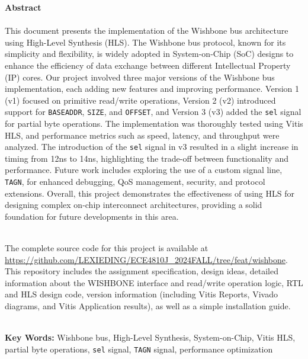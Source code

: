 \documentclass[12pt]{report}
\begin{document}
\newpage
\noindent
{\Large{\textbf{Abstract}}}
\\ \hspace*{\fill} \\
This document presents the implementation of the Wishbone bus architecture using High-Level Synthesis (HLS). The Wishbone bus protocol, known for its simplicity and flexibility, is widely adopted in System-on-Chip (SoC) designs to enhance the efficiency of data exchange between different Intellectual Property (IP) cores. Our project involved three major versions of the Wishbone bus implementation, each adding new features and improving performance. Version 1 (v1) focused on primitive read/write operations, Version 2 (v2) introduced support for \texttt{BASEADDR}, \texttt{SIZE}, and \texttt{OFFSET}, and Version 3 (v3) added the \texttt{sel} signal for partial byte operations. The implementation was thoroughly tested using Vitis HLS, and performance metrics such as speed, latency, and throughput were analyzed. The introduction of the \texttt{sel} signal in v3 resulted in a slight increase in timing from 12ns to 14ns, highlighting the trade-off between functionality and performance. Future work includes exploring the use of a custom signal line, \texttt{TAGN}, for enhanced debugging, QoS management, security, and protocol extensions. Overall, this project demonstrates the effectiveness of using HLS for designing complex on-chip interconnect architectures, providing a solid foundation for future developments in this area.

\noindent
\\
The complete source code for this project is available at \url{https://github.com/LEXIEDING/ECE4810J_2024FALL/tree/feat/wishbone}. This repository includes the assignment specification, design ideas, detailed information about the WISHBONE interface and read/write operation logic, RTL and HLS design code, version information (including Vitis Reports, Vivado diagrams, and Vitis Application results), as well as a simple installation guide.

\noindent
\\
\textbf{Key Words:} Wishbone bus, High-Level Synthesis, System-on-Chip, Vitis HLS, partial byte operations, \texttt{sel} signal, \texttt{TAGN} signal, performance optimization
\end{document}
